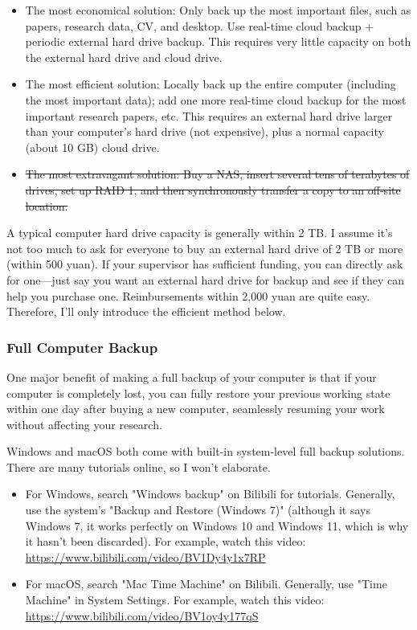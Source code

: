 \begin{itemize}
    \item The most economical solution: Only back up the most important files, such as papers, research data, CV, and desktop. Use real-time cloud backup + periodic external hard drive backup. This requires very little capacity on both the external hard drive and cloud drive.
    \item The most efficient solution: Locally back up the entire computer (including the most important data); add one more real-time cloud backup for the most important research papers, etc. This requires an external hard drive larger than your computer's hard drive (not expensive), plus a normal capacity (about 10 GB) cloud drive.
    \item \sout{The most extravagant solution: Buy a NAS, insert several tens of terabytes of drives, set up RAID 1, and then synchronously transfer a copy to an off-site location.}
\end{itemize}

A typical computer hard drive capacity is generally within 2 TB. I assume it's not too much to ask for everyone to buy an external hard drive of 2 TB or more (within 500 yuan). If your supervisor has sufficient funding, you can directly ask for one—just say you want an external hard drive for backup and see if they can help you purchase one. Reimbursements within 2,000 yuan are quite easy. Therefore, I'll only introduce the efficient method below.

\subsubsection{Full Computer Backup}
\label{sec.pc_backup}

One major benefit of making a full backup of your computer is that if your computer is completely lost, you can fully restore your previous working state within one day after buying a new computer, seamlessly resuming your work without affecting your research.

Windows and macOS both come with built-in system-level full backup solutions. There are many tutorials online, so I won't elaborate.

\begin{itemize}
    \item For Windows, search "Windows backup" on Bilibili for tutorials. Generally, use the system's "Backup and Restore (Windows 7)" (although it says Windows 7, it works perfectly on Windows 10 and Windows 11, which is why it hasn't been discarded). For example, watch this video: \url{https://www.bilibili.com/video/BV1Dy4y1x7RP}
    \item For macOS, search "Mac Time Machine" on Bilibili. Generally, use "Time Machine" in System Settings. For example, watch this video: \url{https://www.bilibili.com/video/BV1oy4y177qS}
\end{itemize}


